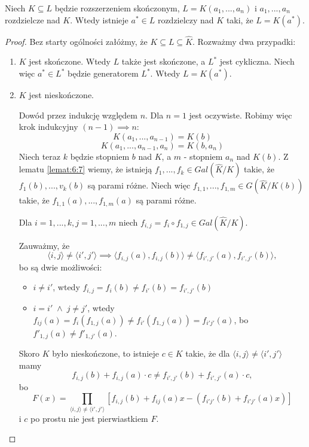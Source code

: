 \begin{theorem}
    Niech $K\subseteq L$ będzie rozszerzeniem skończonym, $L=K(a_1,...,a_n)$ i $a_1,...,a_n$ rozdzielcze nad $K$. Wtedy istnieje $a^*\in L$ rozdzielczy nad $K$ taki, że $L=K(a^*)$.
\end{theorem}
\begin{proof}
    Bez starty ogólności załóżmy, że $K\subseteq L\subseteq \hat{K}$. Rozważmy dwa przypadki:
    \begin{enumerate}
        \item $K$ jest skończone. Wtedy $L$ także jest skończone, a $L^*$ jest cykliczna. Niech więc $a^*\in L^*$ będzie generatorem $L^*$. Wtedy $L=K(a^*)$.
        \item $K$ jest nieskończone.
        
        Dowód przez indukcję względem $n$. Dla $n=1$ jest oczywiste. Robimy więc krok indukcyjny $(n-1)\implies n$:
        $$K(a_1,...,a_{n-1})=K(b)$$
        $$K(a_1,...,a_{n-1}, a_n)=K(b, a_n)$$
        Niech teraz $k$ będzie stopniem $b$ nad $K$, a $m$ - stopniem $a_n$ nad $K(b)$. Z lematu \ref{lemat:6:7} wiemy, że istnieją $f_1,...,f_k\in Gal(\hat{K}/K)$ takie, że $f_1(b),...,v_k(b)$ są parami różne.  Niech więc $f_{1,1},...,f_{1,m}\in G(\hat{K}/K(b))$ takie, że $f_{1,1}(a),...,f_{1,m}(a)$ są parami różne. 

        Dla $i=1,...,k,j=1,...,m$ niech $f_{i,j}=f_i\circ f_{1,j}\in Gal(\hat{K}/K)$.
        \begin{center}
        \end{center}
        Zauważmy, że 
        $$\langle i,j\rangle\neq\langle i',j'\rangle\implies\langle f_{i,j}(a),f_{i,j}(b)\rangle\neq\langle f_{i',j'}(a), f_{i',j'}(b)\rangle,$$
        bo są dwie możliwości: 
        \begin{itemize}
            \item $i\neq i'$, wtedy $f_{i,j}=f_i(b)\neq f_{i'}(b)=f_{i',j'}(b)$
            \item $i=i'\;\land\;j\neq j'$, wtedy $f_{ij}(a)=f_i(f_{1,j}(a))\neq f_{i'}(f_{1,j}(a))=f_{i'j'}(a)$, bo $f'_{1,j}(a)\neq f'_{1, j'}(a)$.
        \end{itemize}
        Skoro $K$ było nieskończone, to istnieje $c\in K$ takie, że dla $\langle i,j\rangle\neq\langle i',j'\rangle$ mamy
        $$f_{i,j}(b)+f_{i,j}(a)\cdot c\neq f_{i',j'}(b)+f_{i',j'}(a)\cdot c,$$
        bo
        $$F(x)=\prod\limits_{\langle i,j\rangle\neq\langle i',j'\rangle}[f_{i,j}(b)+f_{ij}(a)x-(f_{i'j'}(b)+f_{i'j'}(a)x)]$$
        i $c$ po prostu nie jest pierwiastkiem $F$.


\end{enumerate}
\end{proof}
